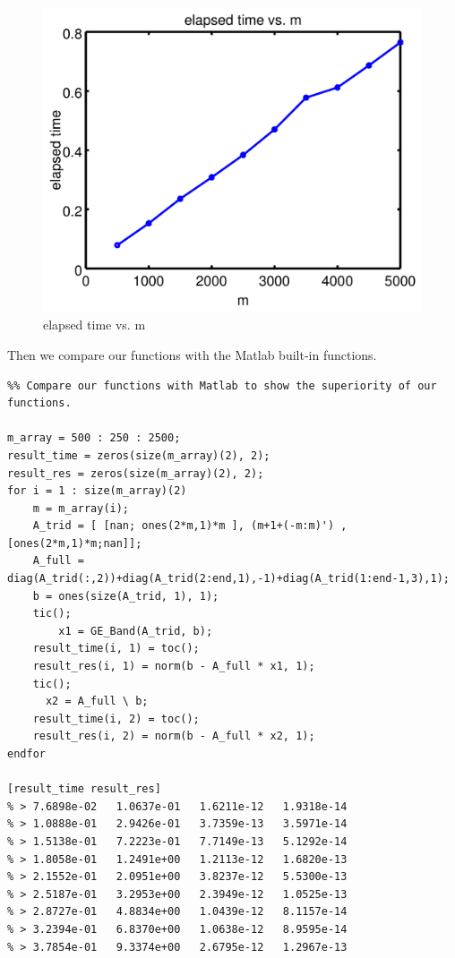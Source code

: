 \documentclass[12pt,oneside,a4paper]{article}
\begin{document}
\begin{figure}[!ht]
  \centering
  \includegraphics[scale=0.6]{./Graph/time_vs_m.pdf}
  \caption{elapsed time vs. m}
  \label{scenA}
\end{figure}

Then we compare our functions with the Matlab built-in functions. 

\begin{lstlisting}
%% Compare our functions with Matlab to show the superiority of our functions.

m_array = 500 : 250 : 2500;
result_time = zeros(size(m_array)(2), 2);
result_res = zeros(size(m_array)(2), 2);
for i = 1 : size(m_array)(2)
    m = m_array(i);
    A_trid = [ [nan; ones(2*m,1)*m ], (m+1+(-m:m)') , [ones(2*m,1)*m;nan]];
    A_full = diag(A_trid(:,2))+diag(A_trid(2:end,1),-1)+diag(A_trid(1:end-1,3),1);
    b = ones(size(A_trid, 1), 1);
    tic();
        x1 = GE_Band(A_trid, b);
    result_time(i, 1) = toc();
    result_res(i, 1) = norm(b - A_full * x1, 1);
    tic();
      x2 = A_full \ b;
    result_time(i, 2) = toc();
    result_res(i, 2) = norm(b - A_full * x2, 1);
endfor

[result_time result_res]
% > 7.6898e-02   1.0637e-01   1.6211e-12   1.9318e-14
% > 1.0888e-01   2.9426e-01   3.7359e-13   3.5971e-14
% > 1.5138e-01   7.2223e-01   7.7149e-13   5.1292e-14
% > 1.8058e-01   1.2491e+00   1.2113e-12   1.6820e-13
% > 2.1552e-01   2.0951e+00   3.8237e-12   5.5300e-13
% > 2.5187e-01   3.2953e+00   2.3949e-12   1.0525e-13
% > 2.8727e-01   4.8834e+00   1.0439e-12   8.1157e-14
% > 3.2394e-01   6.8370e+00   1.0638e-12   8.9595e-14
% > 3.7854e-01   9.3374e+00   2.6795e-12   1.2967e-13
\end{lstlisting}
\end{document}
